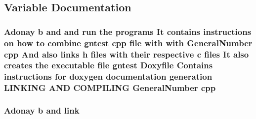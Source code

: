 \subsection{Variable Documentation}
\subsubsection[{cpp}]{\setlength{\rightskip}{0pt plus 5cm}Adonay b and and run the programs It contains instructions on how to combine gntest cpp file with with {\bf General\+Number} cpp And also links h files with their respective c files It also creates the executable file gntest Doxyfile Contains instructions for doxygen documentation generation L\+I\+N\+K\+I\+NG A\+ND C\+O\+M\+P\+I\+L\+I\+NG {\bf General\+Number} cpp}\label{readme_8txt_aee5e2b8cf4d8bb38651d3e06bbe9f763}
\subsubsection[{link}]{\setlength{\rightskip}{0pt plus 5cm}Adonay b and link}\label{readme_8txt_aebc8ab3864b2d326c40739138aabb49b}
